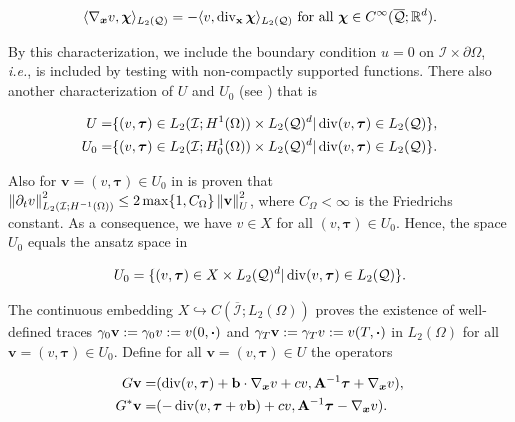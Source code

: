 \begin{equation}\label{chactU0}
  \langle \nabla_{\boldsymbol{x}} v , \boldsymbol{\chi} \rangle_{L_2(\mathcal{Q})}=-\langle v , \operatorname{div}_{\mathbf{x}}\boldsymbol{\chi} \rangle_{L_2(\mathcal{Q})}\text{ for all }\boldsymbol{\chi}\in C^{\infty}(\overline{\mathcal{Q}};\mathbb{R}^d).  
\end{equation}

By this characterization, we include the boundary condition $u=0$ on $\mathcal{I}\times\partial\Omega$, \textit{i.e.}, is included by testing with non-compactly supported functions. There also another characterization of $U$ and $U_0$ (see \cite[Lemma 1]{diening2022space}) that is

\begin{align*}
    U=&\{(v,\boldsymbol{\tau})\in L_2(\mathcal{I};H^1(\Omega))\times L_2(\mathcal{Q})^d|\operatorname{div}(v,\boldsymbol{\tau})\in L_2(\mathcal{Q})\},\\U_0=&\{(v,\boldsymbol{\tau})\in L_2(\mathcal{I};H_0^1(\Omega))\times L_2(\mathcal{Q})^d|\operatorname{div}(v,\boldsymbol{\tau})\in L_2(\mathcal{Q})\}.
\end{align*}

Also for $\mathbf{v}=(v,\boldsymbol{\tau})\in U_0$ in \cite{diening2022space} is proven that $\left\lVert\partial_tv \right\rVert^2_{L_2(\mathcal{I};H^{-1}(\Omega))}\leq 2\max\{1,C_{\Omega}\}\left\lVert\mathbf{v} \right\rVert_U^2$, where $C_\Omega<\infty$ is the Friedrichs constant. As a consequence, we have $v\in X$ for all $(v,\boldsymbol{\tau})\in U_0$. Hence, the space $U_0$ equals the ansatz space in \cite{fuhrer2021space} 

$$U_0=\{(v,\boldsymbol{\tau})\in X\times L_2(\mathcal{Q})^d|\operatorname{div}(v,\boldsymbol{\tau})\in L_2(\mathcal{Q})\}.$$

The continuous embedding $X\hookrightarrow C(\overline{\mathcal{I}};L_2(\Omega))$  \cite[Chap. 1, Theorem 3.1]{lions2012non} proves the existence of well-defined traces $\gamma_0\mathbf{v}:=\gamma_0v:=v(0,\boldsymbol{\cdot})$ and $\gamma_T\mathbf{v}:=\gamma_Tv:=v(T,\boldsymbol{\cdot})$ in $L_2(\Omega)$ for all $\mathbf{v}=(v,\boldsymbol{\tau})\in U_0$. Define for all $\mathbf{v}=(v,\boldsymbol{\tau})\in U$ the operators

\begin{subequations}
    \begin{align}
        G\mathbf{v}=&(\operatorname{div}(v,\boldsymbol{\tau})+\mathbf{b}\cdot\nabla_{\boldsymbol{x}} v+cv,\mathbf{A}^{-1}\boldsymbol{\tau}+\nabla_{\boldsymbol{x}} v),\\
        G^*\mathbf{v}=&(-\operatorname{div}(v,\boldsymbol{\tau}+v\mathbf{b})+cv,\mathbf{A}^{-1}\boldsymbol{\tau}-\nabla_{\boldsymbol{x}} v).
    \end{align}
\end{subequations}

